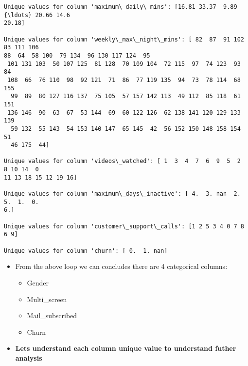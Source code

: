 \documentclass[11pt]{article}
\providecommand{\tightlist}{%
      \setlength{\itemsep}{0pt}\setlength{\parskip}{0pt}}
\begin{document}
\begin{Verbatim}[commandchars=\\\{\}]
Unique values for column 'maximum\_daily\_mins': [16.81 33.37  9.89 {\ldots} 20.66 14.6
20.18]

Unique values for column 'weekly\_max\_night\_mins': [ 82  87  91 102  83 111 106
88  64  58 100  79 134  96 130 117 124  95
 101 131 103  50 107 125  81 128  70 109 104  72 115  97  74 123  93  84
 108  66  76 110  98  92 121  71  86  77 119 135  94  73  78 114  68 155
  99  89  80 127 116 137  75 105  57 157 142 113  49 112  85 118  61 151
 136 146  90  63  67  53 144  69  60 122 126  62 138 141 120 129 133 139
  59 132  55 143  54 153 140 147  65 145  42  56 152 150 148 158 154  51
  46 175  44]

Unique values for column 'videos\_watched': [ 1  3  4  7  6  9  5  2  8 10 14  0
11 13 18 15 12 19 16]

Unique values for column 'maximum\_days\_inactive': [ 4.  3. nan  2.  5.  1.  0.
6.]

Unique values for column 'customer\_support\_calls': [1 2 5 3 4 0 7 8 6 9]

Unique values for column 'churn': [ 0.  1. nan]

    \end{Verbatim}

    \begin{itemize}
\tightlist
\item
  From the above loop we can concludes there are 4 categorical columns:

  \begin{itemize}
  \tightlist
  \item
    Gender
  \item
    Multi\_screen
  \item
    Mail\_subscribed
  \item
    Churn
  \end{itemize}
\end{itemize}

    \begin{itemize}
\tightlist
\item
  \textbf{Lets understand each column unique value to understand futher
  analysis}
\end{itemize}
\end{document}

